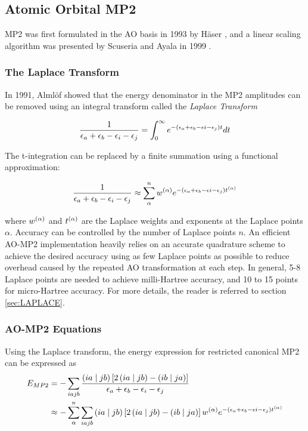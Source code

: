 \subsection{Atomic Orbital MP2}

MP2 was first formulated in the AO basis in 1993 by Häser \cite{Has1993}, and a linear scaling algorithm was presented by Scuseria and Ayala in 1999 \cite{Scu1999}. 

\subsubsection{The Laplace Transform}

In 1991, Almlöf showed \cite{Alm1991} that the energy denominator in the MP2 amplitudes can be removed using an integral transform called the \emph{Laplace Transform}

\begin{equation}
\frac{1}{\epsilon_a + \epsilon_b - \epsilon_i - \epsilon_j} = \int_0^{\infty} e^{-\left(\epsilon_a + \epsilon_b - \epsilon i - \epsilon_j\right)t} dt
\end{equation}

The t-integration can be replaced \cite{Has1993} by a finite summation using a functional approximation:

\begin{equation}
\frac{1}{\epsilon_a + \epsilon_b - \epsilon_i - \epsilon_j} \approx \sum_{\alpha}^{n} w^{(\alpha)} e^{-\left(\epsilon_a + \epsilon_b - \epsilon i - \epsilon_j\right)t^{(\alpha)}}
\end{equation} 

\noindent where $w^{(\alpha)}$ and $t^{(\alpha)}$ are the Laplace weights and exponents at the Laplace points $\alpha$. Accuracy can be controlled by the number of Laplace points $n$. An efficient AO-MP2 implementation heavily relies on an accurate quadrature scheme to achieve the desired accuracy using as few Laplace points as possible to reduce overhead caused by the repeated AO transformation at each step. In general, 5-8 Laplace points are needed to achieve milli-Hartree accuracy, and 10 to 15 points for micro-Hartree accuracy. For more details, the reader is referred to section \ref{sec:LAPLACE}.

\subsubsection{AO-MP2 Equations}

Using the Laplace transform, the energy expression for restricted canonical MP2 can be expressed as
\begin{equation}
\begin{split}
E_{MP2} &= - \sum_{iajb} \frac{\left( ia \mid jb \right) \left[2 \left( ia \mid jb \right) - \left( ib \mid ja \right) \right]}{\epsilon_a + \epsilon_b - \epsilon_i - \epsilon_j} \\
&\approx - \sum_{\alpha}^n \sum_{iajb} \left( ia \mid jb \right) \left[2 \left( ia \mid jb \right) - \left( ib \mid ja \right) \right] w^{(\alpha)} e^{-\left(\epsilon_a + \epsilon_b - \epsilon i - \epsilon_j\right)t^{(\alpha)}}
\end{split}
\end{equation}

